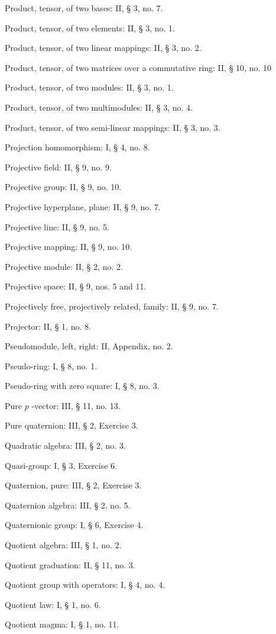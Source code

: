 Product, tensor, of two bases: II, § 3, no. 7.

Product, tensor, of two elements: II, § 3, no. 1.

Product, tensor, of two linear mappings: II, § 3, no. 2.

Product, tensor, of two matrices over a commutative ring: II, § 10, no. 10

Product, tensor, of two modules: II, § 3, no. 1.

Product, tensor, of two multimodules: II, § 3, no. 4.

Product, tensor, of two semi-linear mappings: II, § 3, no. 3.

Projection homomorphism: I, § 4, no. 8.

Projective field: II, § 9, no. 9.

Projective group: II, § 9, no. 10.

Projective hyperplane, plane: II, § 9, no. 7.

Projective line: II, § 9, no. 5.

Projective mapping: II, § 9, no. 10.

Projective module: II, § 2, no. 2.

Projective space: II, § 9, nos. 5 and 11.

Projectively free, projectively related, family: II, § 9, no. 7.

Projector: II, § 1, no. 8.

Pseudomodule, left, right: II, Appendix, no. 2.

Pseudo-ring: I, § 8, no. 1.

Pseudo-ring with zero square: I, § 8, no. 3.

Pure \(p\) -vector: III, § 11, no. 13.

Pure quaternion: III, § 2, Exercise 3.

Quadratic algebra: III, § 2, no. 3.

Quasi-group: I, § 3, Exercise 6.

Quaternion, pure: III, § 2, Exercise 3.

Quaternion algebra: III, § 2, no. 5.

Quaternionic group: I, § 6, Exercise 4.

Quotient algebra: III, § 1, no. 2.

Quotient graduation: II, § 11, no. 3.

Quotient group with operators: I, § 4, no. 4.

Quotient law: I, § 1, no. 6.

Quotient magma: I, § 1, no. 11.

